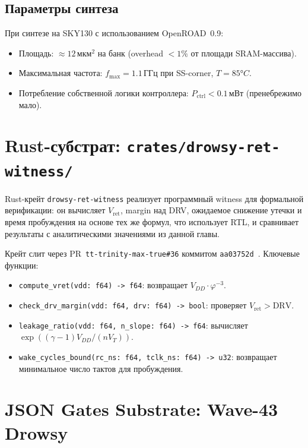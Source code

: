 \subsection{Параметры синтеза}

При синтезе на SKY130 с использованием OpenROAD~0.9:
\begin{itemize}
  \item Площадь: $\approx 12\,\text{мкм}^2$ на банк
        (overhead $< 1\%$ от площади SRAM-массива).
  \item Максимальная частота: $f_\mathrm{max} = 1.1\,\text{ГГц}$
        при SS-corner, $T = 85°C$.
  \item Потребление собственной логики контроллера:
        $P_\mathrm{ctrl} < 0.1\,\text{мВт}$ (пренебрежимо мало).
\end{itemize}

\section{Rust-субстрат: \texttt{crates/drowsy-ret-witness/}}
\label{sec:glava89-rust}

Rust-крейт \texttt{drowsy-ret-witness} реализует
программный witness для формальной верификации:
он вычисляет $V_\mathrm{ret}$, margin над DRV,
ожидаемое снижение утечки и время пробуждения
на основе тех же формул, что использует RTL,
и сравнивает результаты с аналитическими значениями
из данной главы.

Крейт слит через PR~\texttt{tt-trinity-max-true\#36}
коммитом \texttt{aa03752d}~\cite{ttmt36}.
Ключевые функции:
%
\begin{itemize}
  \item \texttt{compute\_vret(vdd: f64) -> f64}:
        возвращает $V_{DD} \cdot \varphi^{-3}$.
  \item \texttt{check\_drv\_margin(vdd: f64, drv: f64) -> bool}:
        проверяет $V_\mathrm{ret} > \mathrm{DRV}$.
  \item \texttt{leakage\_ratio(vdd: f64, n\_slope: f64) -> f64}:
        вычисляет $\exp((\gamma-1) V_{DD}/(n V_T))$.
  \item \texttt{wake\_cycles\_bound(rc\_ns: f64, tclk\_ns: f64) -> u32}:
        возвращает минимальное число тактов для пробуждения.
\end{itemize}

\section{JSON Gates Substrate: Wave-43 Drowsy}
\label{sec:glava89-json}

